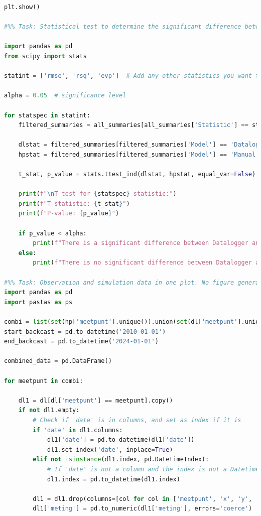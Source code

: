 \begin{lstlisting}[language=Python]
plt.show()

#%% Task: Statistical test to determine the significant difference between 'Datalogger' and 'Manual'. 

import pandas as pd
from scipy import stats

statint = ['rmse', 'rsq', 'evp']  # Add any other statistics you want to test

alpha = 0.05  # significance level

for statspec in statint:
    filtered_summaries = all_summaries[all_summaries['Statistic'] == statspec]

    dlstat = filtered_summaries[filtered_summaries['Model'] == 'Datalogger']['Value']
    hpstat = filtered_summaries[filtered_summaries['Model'] == 'Manual']['Value']

    t_stat, p_value = stats.ttest_ind(dlstat, hpstat, equal_var=False)  # Welch's t-test

    print(f"\nT-test for {statspec} statistic:")
    print(f"T-statistic: {t_stat}")
    print(f"P-value: {p_value}")

    if p_value < alpha:
        print(f"There is a significant difference between Datalogger and Manual for the {statspec} statistic (p < {alpha}).")
    else:
        print(f"There is no significant difference between Datalogger and Manual for the {statspec} statistic (p >= {alpha}).")

#%% Task: Observation and simulation data in one plot. No figure generated.
import pandas as pd
import pastas as ps

combi = list(set(hp['meetpunt'].unique()).union(set(dl['meetpunt'].unique())))
start_backcast = pd.to_datetime('2010-01-01')
end_backcast = pd.to_datetime('2024-01-01')

combined_data = pd.DataFrame()

for meetpunt in combi:
    
    dl1 = dl[dl['meetpunt'] == meetpunt].copy()
    if not dl1.empty:
        # Check if 'date' is in columns, and set as index if it is
        if 'date' in dl1.columns:
            dl1['date'] = pd.to_datetime(dl1['date'])
            dl1.set_index('date', inplace=True)
        elif not isinstance(dl1.index, pd.DatetimeIndex):
            # If 'date' is not a column and the index is not a DatetimeIndex, convert index to datetime
            dl1.index = pd.to_datetime(dl1.index)
        
        dl1 = dl1.drop(columns=[col for col in ['meetpunt', 'x', 'y', 'ID', 'meethoogte', 'waarneming'] if col in dl1.columns])
        dl1['meting'] = pd.to_numeric(dl1['meting'], errors='coerce')
        

\end{lstlisting}
